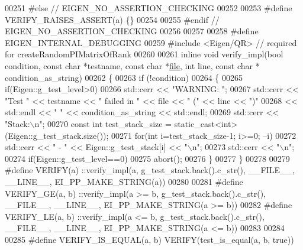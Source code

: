 \begin{DoxyCode}
00251 \textcolor{preprocessor}{#else // EIGEN\_NO\_ASSERTION\_CHECKING}
00252 
00253 \textcolor{preprocessor}{  #define VERIFY\_RAISES\_ASSERT(a) \{\}}
00254 
00255 \textcolor{preprocessor}{#endif // EIGEN\_NO\_ASSERTION\_CHECKING}
00256 
00257 
00258 \textcolor{preprocessor}{#define EIGEN\_INTERNAL\_DEBUGGING}
00259 \textcolor{preprocessor}{#include <Eigen/QR>} \textcolor{comment}{// required for createRandomPIMatrixOfRank}
00260 
00261 \textcolor{keyword}{inline} \textcolor{keywordtype}{void} verify\_impl(\textcolor{keywordtype}{bool} condition, \textcolor{keyword}{const} \textcolor{keywordtype}{char} *testname, \textcolor{keyword}{const} \textcolor{keywordtype}{char} *\hyperlink{structfile}{file}, \textcolor{keywordtype}{int} line, \textcolor{keyword}{const} \textcolor{keywordtype}{char} *
      condition\_as\_string)
00262 \{
00263   \textcolor{keywordflow}{if} (!condition)
00264   \{
00265     \textcolor{keywordflow}{if}(Eigen::g\_test\_level>0)
00266       std::cerr << \textcolor{stringliteral}{"WARNING: "};
00267     std::cerr << \textcolor{stringliteral}{"Test "} << testname << \textcolor{stringliteral}{" failed in "} << file << \textcolor{stringliteral}{" ("} << line << \textcolor{stringliteral}{")"}
00268       << std::endl << \textcolor{stringliteral}{"    "} << condition\_as\_string << std::endl;
00269     std::cerr << \textcolor{stringliteral}{"Stack:\(\backslash\)n"};
00270     \textcolor{keyword}{const} \textcolor{keywordtype}{int} test\_stack\_size = \textcolor{keyword}{static\_cast<}\textcolor{keywordtype}{int}\textcolor{keyword}{>}(Eigen::g\_test\_stack.size());
00271     \textcolor{keywordflow}{for}(\textcolor{keywordtype}{int} i=test\_stack\_size-1; i>=0; --i)
00272       std::cerr << \textcolor{stringliteral}{"  - "} << Eigen::g\_test\_stack[i] << \textcolor{stringliteral}{"\(\backslash\)n"};
00273     std::cerr << \textcolor{stringliteral}{"\(\backslash\)n"};
00274     \textcolor{keywordflow}{if}(Eigen::g\_test\_level==0)
00275       abort();
00276   \}
00277 \}
00278 
00279 \textcolor{preprocessor}{#define VERIFY(a) ::verify\_impl(a, g\_test\_stack.back().c\_str(), \_\_FILE\_\_, \_\_LINE\_\_, EI\_PP\_MAKE\_STRING(a))}
00280 
00281 \textcolor{preprocessor}{#define VERIFY\_GE(a, b) ::verify\_impl(a >= b, g\_test\_stack.back().c\_str(), \_\_FILE\_\_, \_\_LINE\_\_,
       EI\_PP\_MAKE\_STRING(a >= b))}
00282 \textcolor{preprocessor}{#define VERIFY\_LE(a, b) ::verify\_impl(a <= b, g\_test\_stack.back().c\_str(), \_\_FILE\_\_, \_\_LINE\_\_,
       EI\_PP\_MAKE\_STRING(a <= b))}
00283 
00284 
00285 \textcolor{preprocessor}{#define VERIFY\_IS\_EQUAL(a, b) VERIFY(test\_is\_equal(a, b, true))}

\end{DoxyCode}
